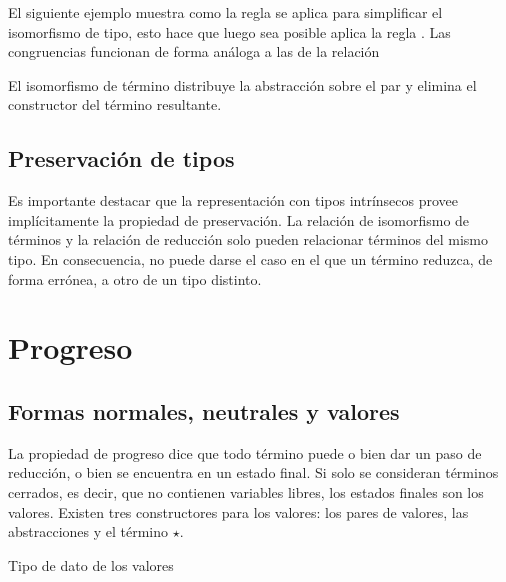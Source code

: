 \begin{example}
	El siguiente ejemplo muestra como la regla  se aplica para simplificar el isomorfismo de tipo, esto hace que luego sea posible aplica la regla .
	Las congruencias funcionan de forma análoga a las de la relación \type{$\_\hookrightarrow\_$}
\end{example}

\begin{example}
	El isomorfismo de término  distribuye la abstracción sobre el par y elimina el constructor  del término resultante.
\end{example}

\subsection{Preservación de tipos}

Es importante destacar que la representación con tipos intrínsecos provee implícitamente la propiedad de preservación.
La relación de isomorfismo de términos \type{$\_\rightleftarrows\_$} y la relación de reducción \type{$\_\hookrightarrow\_$} solo pueden relacionar términos del mismo tipo. 
En consecuencia, no puede darse el caso en el que un término reduzca, de forma errónea, a otro de un tipo distinto.


\section{Progreso}

\subsection{Formas normales, neutrales y valores}

La propiedad de progreso dice que todo término puede o bien dar un paso de reducción, o bien se encuentra en un estado final.
Si solo se consideran términos cerrados, es decir, que no contienen variables libres, los estados finales son los valores.
Existen tres constructores para los valores: los pares de valores, las abstracciones y el término $\star$.

\begin{codigo}
	Tipo de dato de los valores
\end{codigo}

